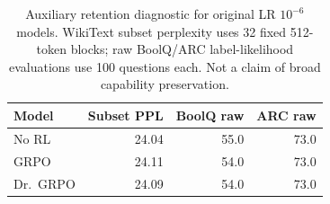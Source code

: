 \begin{table}[t]
\centering
\caption{Auxiliary retention diagnostic for original LR $10^{-6}$ models. WikiText subset perplexity uses 32 fixed 512-token blocks; raw BoolQ/ARC label-likelihood evaluations use 100 questions each. Not a claim of broad capability preservation.}
\label{tab:retention}
\footnotesize
\setlength{\tabcolsep}{4pt}
\begin{tabular}{lrrr}
\toprule
Model & Subset PPL & BoolQ raw & ARC raw\\
\midrule
No RL & 24.04 & 55.0 & 73.0\\
GRPO & 24.11 & 54.0 & 73.0\\
Dr.~GRPO & 24.09 & 54.0 & 73.0\\
\bottomrule
\end{tabular}
\end{table}
